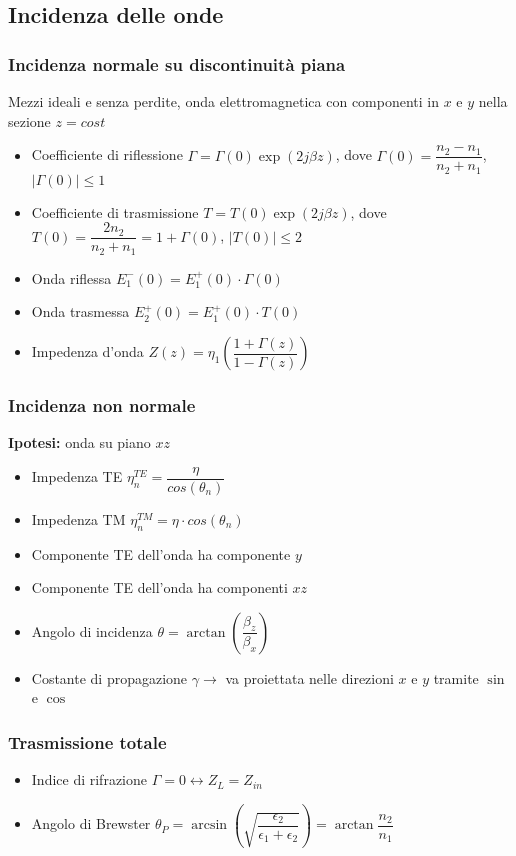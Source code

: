 \documentclass{article}
\begin{document}
\subsection{Incidenza delle onde}

\subsubsection{Incidenza normale su discontinuità piana}
Mezzi ideali e senza perdite, onda elettromagnetica con componenti in \( x \) e \( y \) nella sezione \( z = cost \)
\begin{itemize}
	\item Coefficiente di riflessione \( \Gamma = \Gamma(0) \exp(2 j \beta z)  \), dove \( \Gamma(0) = \dfrac{n_2 - n_1}{n_2 + n_1}\), \( | \Gamma(0) | \leq 1 \)
	\item Coefficiente di trasmissione \( T = T(0) \exp(2 j \beta z)  \), dove \( T(0) = \dfrac{2 n_2}{n_2 + n_1} = 1 + \Gamma(0)\), \( | T(0) | \leq 2 \)
	\item Onda riflessa \( E_1^-(0) =  E_1^+(0) \cdot \Gamma (0) \)
	\item Onda trasmessa \( E_2^+(0) =  E_1^+(0) \cdot T (0) \)
	\item Impedenza d'onda \( Z(z) = \eta_1 \left(\dfrac{1 + \Gamma(z)}{1 - \Gamma(z)}\right) \)
\end{itemize}

\subsubsection{Incidenza non normale}
\textbf{Ipotesi:} onda su piano \(xz\)
\begin{itemize}
	\item Impedenza TE \( \eta^{TE}_n = \dfrac{\eta}{cos(\theta_n)} \)
	\item Impedenza TM \( \eta^{TM}_n = \eta \cdot cos(\theta_n) \)
	\item Componente TE dell'onda ha componente \(y\)
	\item Componente TE dell'onda ha componenti \(xz\)
	\item Angolo di incidenza \( \theta = \arctan\left( \dfrac{\beta_z}{\beta_x} \right) \)
	\item Costante di propagazione \(\gamma \rightarrow\) va proiettata nelle direzioni \(x\) e \(y\) tramite \(\sin\) e \(\cos\)
\end{itemize}

\subsubsection{Trasmissione totale}
\begin{itemize}
	\item Indice di rifrazione \( \Gamma = 0 \leftrightarrow Z_L = Z_{in} \)
	\item Angolo di Brewster \( \theta_P = \arcsin\left(\sqrt{\dfrac{\epsilon_2}{\epsilon_1 + \epsilon_2}}\right) = \arctan\dfrac{n_2}{n_1}\)
\end{itemize}
\end{document}
